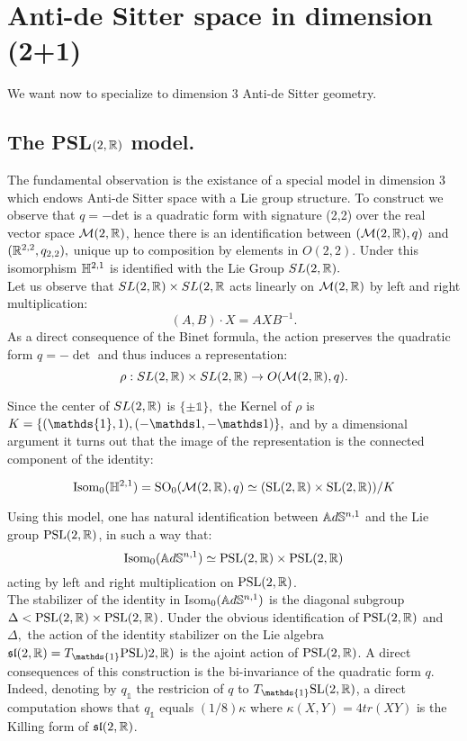 \chapter{Anti-de Sitter space in dimension (2+1)}
We want now to specialize to dimension 3 Anti-de Sitter geometry. 
\section{The {PSL}$(2,\mathbb{R})$ model.} The fundamental observation is the existance of a special model in dimension 3 which endows Anti-de Sitter space with a Lie group structure. To construct we observe that $q=-$det is a quadratic form with signature (2,2) over the real vector space $\mathcal{M}(2,\mathbb{R})$, hence there is an identification between $(\mathcal{M}(2,\mathbb{R}),q)$ and $(\mathbb{R}^{2,2}, q_{2,2}),$ unique up to composition by elements in $O(2,2)$. Under this isomorphism $\mathbb{H}^{2,1}$ is identified with the Lie Group $SL(2,\mathbb{R}).$\\
Let us observe that $SL(2,\mathbb{R})\times SL(2,\mathbb{R}$ acts linearly on $\mathcal{M}(2,\mathbb{R})$ by left and right multiplication:
\[
    (A,B)\cdot X=AXB^{-1}.
\]
As a direct consequence of the Binet formula, the action preserves the quadratic form $q=-\det$ and thus induces a representation: 
\[ \rho:SL(2,\mathbb{R})\times SL(2,\mathbb{R})\to O(\mathcal{M}(2,\mathbb{R}),q). \]

Since the center of $SL(2,\mathbb{R})$ is $\{\pm \mathds{1}\},$ the Kernel of $\rho$ is $K=\{(\mathds{1},1),(-\1,-\1)\},$ and by a dimensional argument it turns out that the image of the representation is the connected component of the identity:

\[
    \text{Isom}_0(\mathbb{H}^{2,1})=\text{SO}_0(\mathcal{M}(2,\mathbb{R}),q)\simeq (\text{SL}(2,\mathbb{R})\times \text{SL}(2,\mathbb{R}))/K
\]
    
Using this model, one has natural identification between $\mathbb{A}d\mathbb{S}^{n,1}$ and the Lie group $\text{PSL}(2,\mathbb{R})$, in such a way that: 
\[
    \text{Isom}_0(\mathbb{A}d\mathbb{S}^{n,1})\simeq \text{PSL}(2,\mathbb{R})\times\text{PSL}(2,\mathbb{R})
\]
acting by left and right multiplication on $\text{PSL}(2,\mathbb{R})$.\\
The stabilizer of the identity in Isom$_0(\mathbb{A}d\mathbb{S}^{n,1})$ is the diagonal subgroup $\Delta<\text{PSL}(2,\mathbb{R})\times\text{PSL}(2,\mathbb{R})$. Under the obvious identification of $\text{PSL}(2,\mathbb{R})$ and $\Delta,$ the action of the identity stabilizer on the Lie algebra $\mathfrak{sl}(2,\R)=T_{\mathds{1}}\text{PSL})2,\R)$ is the ajoint action of $\text{PSL}(2,\mathbb{R})$. A direct consequences of this construction is the bi-invariance of the quadratic form $q$. Indeed, denoting by $q_{\mathds{1}}$ the restricion of $q$ to $T_{\mathds{1}}\text{SL}(2,\R)$, a direct computation shows that $q_\mathds{1}$ equals $(1/8)\kappa$ where $\kappa(X,Y)=4tr(XY)$ is the Killing form of $\mathfrak{sl}(2, \mathbb{R})$.

